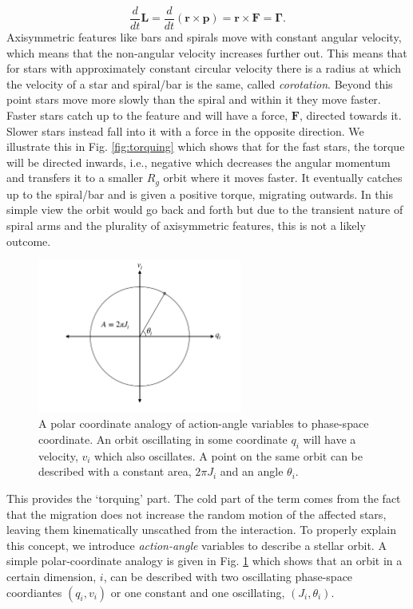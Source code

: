 \begin{equation}
    \frac{d}{dt}\pmb{L} = \frac{d}{dt}(\pmb{r}\times\pmb{p}) = \pmb{r}\times\pmb{F} = \pmb{\Gamma}.
\end{equation}
Axisymmetric features like bars and spirals move with constant angular velocity, which means that the non-angular velocity increases further out. This means that for stars with approximately constant circular velocity there is a radius at which the velocity of a star and spiral/bar is the same, called \textit{corotation}. Beyond this point stars move more slowly than the spiral and within it they move faster. Faster stars catch up to the feature and will have a force, $\pmb{F}$, directed towards it. Slower stars instead fall into it with a force in the opposite direction. We illustrate this in Fig. \ref{fig:torquing} which shows that for the fast stars, the torque will be directed inwards, i.e., negative which decreases the angular momentum and transfers it to a smaller $R_g$ orbit where it moves faster. It eventually catches up to the spiral/bar and is given a positive torque, migrating outwards. In this simple view the orbit would go back and forth but due to the transient nature of spiral arms and the plurality of axisymmetric features, this is not a likely outcome.

\begin{figure}[t]
    \centering
    \includegraphics[width=0.6\textwidth]{images/actionangle.pdf}
    \caption{A polar coordinate analogy of action-angle variables to phase-space coordinate. An orbit oscillating in some coordinate $q_i$ will have a velocity, $v_i$ which also oscillates. A point on the same orbit can be described with a constant area, $2\pi J_i$ and an angle $\theta_i$.} %
    \label{fig:actionangle}
\end{figure}

This provides the `torquing' part. The cold part of the term comes from the fact that the migration does not increase the random motion of the affected stars, leaving them kinematically unscathed from the interaction. To properly explain this concept, we introduce \textit{action-angle} variables to describe a stellar orbit. A simple polar-coordinate analogy is given in Fig. \ref{fig:actionangle} which shows that an orbit in a certain dimension, $i$, can be described with two oscillating phase-space coordiantes $(q_i, v_i)$ or one constant and one oscillating, $(J_i, \theta_i)$.

